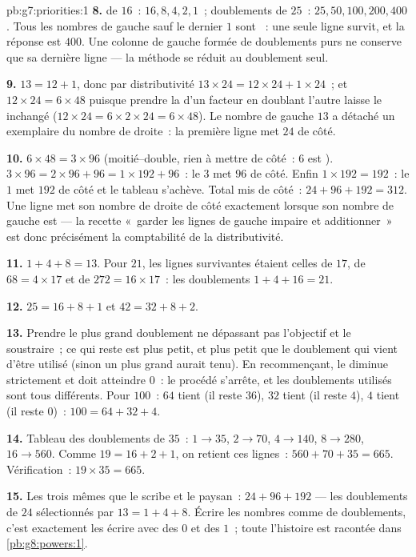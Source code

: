 \begin{solution}{pb:g7:priorities:1}
\textbf{8.}  de $16$~: $16, 8, 4, 2, 1$~; doublements de
$25$~: $25, 50, 100, 200, 400$. Tous les nombres de gauche sauf le
dernier $1$ sont ~: une seule ligne survit, et la réponse est
$400$. Une colonne de gauche formée de doublements purs ne conserve
que sa dernière ligne --- la méthode se réduit au doublement seul.

\textbf{9.} $13 = 12 + 1$, donc par distributivité
$13 \times 24 = 12 \times 24 + 1 \times 24$~; et
$12 \times 24 = 6 \times 48$ puisque prendre la  d'un facteur
en doublant l'autre laisse le  inchangé
($12 \times 24 = 6 \times 2 \times 24 = 6 \times 48$). Le nombre de
gauche  $13$ a détaché un exemplaire du nombre de droite~: la
première ligne met $24$ de côté.

\textbf{10.} $6 \times 48 = 3 \times 96$ (moitié--double, rien à
mettre de côté~: $6$ est ). $3 \times 96 = 2 \times 96 + 96 =
1 \times 192 + 96$~: le $3$  met $96$ de côté. Enfin
$1 \times 192 = 192$~: le $1$  met $192$ de côté et le tableau
s'achève. Total mis de côté~: $24 + 96 + 192 = 312$. Une ligne met
son nombre de droite de côté exactement lorsque son nombre de gauche
est  --- la recette «~garder les lignes de gauche impaire et
additionner~» est donc précisément la comptabilité de la
distributivité.

\textbf{11.} $1 + 4 + 8 = 13$. Pour $21$, les lignes survivantes
étaient celles de $17$, de $68 = 4 \times 17$ et de
$272 = 16 \times 17$~: les doublements $1 + 4 + 16 = 21$.

\textbf{12.} $25 = 16 + 8 + 1$ et $42 = 32 + 8 + 2$.

\textbf{13.} Prendre le plus grand doublement ne dépassant pas
l'objectif et le soustraire~; ce qui reste est plus petit, et plus
petit que le doublement qui vient d'être utilisé (sinon un plus
grand aurait tenu). En recommençant, le  diminue strictement et
doit atteindre $0$~: le procédé s'arrête, et les doublements
utilisés sont tous différents. Pour $100$~: $64$ tient (il reste
$36$), $32$ tient (il reste $4$), $4$ tient (il reste $0$)~:
$100 = 64 + 32 + 4$.

\textbf{14.} Tableau des doublements de $35$~: $1 \to 35$,
$2 \to 70$, $4 \to 140$, $8 \to 280$, $16 \to 560$. Comme
$19 = 16 + 2 + 1$, on retient ces lignes~:
$560 + 70 + 35 = 665$. Vérification~: $19 \times 35 = 665$.

\textbf{15.} Les trois mêmes que le scribe et le paysan~:
$24 + 96 + 192$ --- les doublements de $24$ sélectionnés par
$13 = 1 + 4 + 8$. Écrire les nombres comme  de doublements,
c'est exactement les écrire avec des $0$ et des $1$~; toute
l'histoire est racontée dans \cref{pb:g8:powers:1}.
\end{solution}
